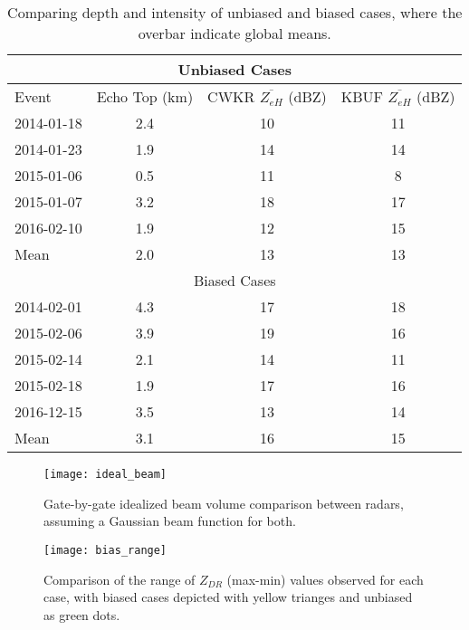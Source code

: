 \begin{table}[H]
    \caption{Comparing depth and intensity of unbiased and biased cases, where the overbar indicate global means.}\label{diagnosebias}
    \begin{center}
    \begin{tabular}{|l|c|c|c|}
    \hline
    \multicolumn{4}{|c|}{Unbiased Cases} \\
    \hline
     Event & Echo Top (km) & CWKR $\overline{Z_{eH}}$ (dBZ) & KBUF $\overline{Z_{eH}}$ (dBZ)\\
    \hline\hline
    2014-01-18 & 2.4 & 10 & 11 \\
    \hline
    2014-01-23 & 1.9 & 14 & 14 \\
    \hline
    2015-01-06 & 0.5 & 11 & 8 \\
    \hline
    2015-01-07 & 3.2 & 18 & 17 \\ 
    \hline
    2016-02-10 & 1.9 & 12 & 15 \\ 
    \hline\hline
    Mean & 2.0 & 13 & 13\\
    \hline
    \multicolumn{4}{|c|}{Biased Cases} \\
    \hline\hline
    2014-02-01 & 4.3 & 17 & 18\\
    \hline
    2015-02-06 & 3.9 & 19 & 16\\
    \hline
    2015-02-14 & 2.1 & 14 & 11\\
    \hline
    2015-02-18 & 1.9 & 17 & 16\\ 
    \hline
    2016-12-15 & 3.5 & 13 & 14  \\ 
    \hline\hline
    Mean & 3.1 & 16 & 15 \\
    \hline
    \end{tabular}
    \end{center}
\end{table}
\begin{figure}[H]
\centering
\texttt{[image: ideal\_beam]}
\caption{Gate-by-gate idealized beam volume comparison between radars, assuming a Gaussian beam function for both.} 
\label{fig:ideal_beam}
\end{figure}

\begin{figure}[H]
\centering
\texttt{[image: bias\_range]}
\caption{Comparison of the range of $Z_{DR}$ (max-min) values observed for each case, with biased cases depicted with yellow trianges and unbiased as green dots.} 
\label{fig:bias_range}
\end{figure}
